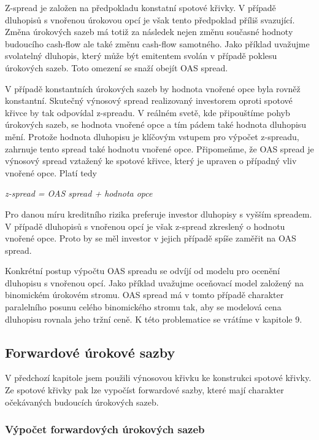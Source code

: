 \documentclass[a4paper]{book}
\begin{document}
Z-spread je založen na předpokladu konstatní spotové křivky. V případě dluhopisů s vnořenou úrokovou opcí je však tento předpoklad příliš svazující. Změna úrokových sazeb má totiž za následek nejen změnu současné hodnoty budoucího cash-flow ale také změnu cash-flow samotného. Jako příklad uvažujme svolatelný dluhopis, který může být emitentem svolán v případě poklesu úrokových sazeb. Toto omezení se snaží obejít OAS spread.

V případě konstantních úrokových sazeb by hodnota vnořené opce byla rovněž konstantní. Skutečný výnosový spread realizovaný investorem oproti spotové křivce by tak odpovídal z-spreadu. V reálném svetě, kde připouštíme pohyb úrokových sazeb, se hodnota vnořené opce a tím pádem také hodnota dluhopisu mění. Protože hodnota dluhopisu je klíčovým vstupem pro výpočet z-spreadu, zahrnuje tento spread také hodnotu vnořené opce. Připomeňme, že OAS spread je výnosový spread vztažený ke spotové křivce, který je upraven o případný vliv vnořené opce. Platí tedy
\begin{center}
\textit{z-spread = OAS spread + hodnota opce}
\end{center}
Pro danou míru kreditního rizika preferuje investor dluhopisy s vyšším spreadem. V případě dluhopisů s vnořenou opcí je však z-spread zkreslený o hodnotu vnořené opce. Proto by se měl investor v jejich případě spíše zaměřit na OAS spread.

Konkrétní postup výpočtu OAS spreadu se odvíjí od modelu pro ocenění dluhopisu s vnořenou opcí. Jako příklad uvažujme oceňovací model založený na binomickém úrokovém stromu. OAS spread má v tomto případě charakter paralelního posunu celého binomického stromu tak, aby se modelová cena dluhopisu rovnala jeho tržní ceně. K této problematice se vrátíme v kapitole 9.

\subsection{Forwardové úrokové sazby}

V předchozí kapitole jsem použili výnosovou křivku ke konstrukci spotové křivky. Ze spotové křivky pak lze vypočíst forwardové sazby, které mají charakter očekávaných budoucích úrokových sazeb.

\subsubsection{Výpočet forwardových úrokových sazeb}
\end{document}
